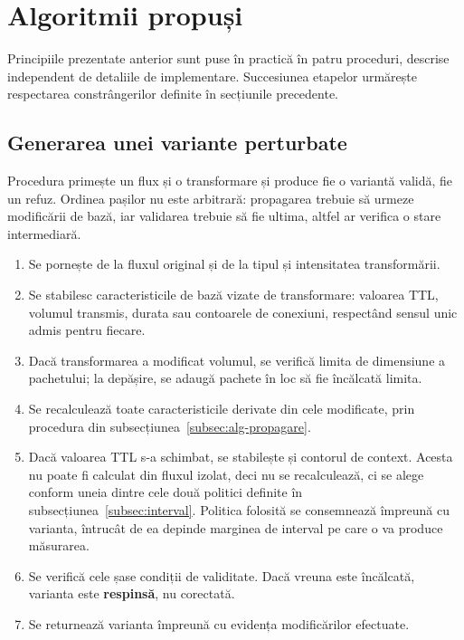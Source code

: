 \section{Algoritmii propuși}\label{sec:algoritmi}

Principiile prezentate anterior sunt puse în practică în patru proceduri, descrise independent de detaliile de implementare. Succesiunea etapelor urmărește respectarea constrângerilor definite în secțiunile precedente.

\subsection{Generarea unei variante perturbate}\label{subsec:alg-generare}

Procedura primește un flux și o transformare și produce fie o variantă validă, fie un refuz. Ordinea pașilor nu este arbitrară: propagarea trebuie să urmeze modificării de bază, iar validarea trebuie să fie ultima, altfel ar verifica o stare intermediară.

\begin{algorithm}[!ht]
\caption{Generarea unei variante perturbate}\label{alg:generare}
\begin{enumerate}\itemsep2pt
    \item Se pornește de la fluxul original și de la tipul și intensitatea transformării.
    \item Se stabilesc caracteristicile de bază vizate de transformare: valoarea TTL, volumul transmis, durata sau contoarele de conexiuni, respectând sensul unic admis pentru fiecare.
    \item Dacă transformarea a modificat volumul, se verifică limita de dimensiune a pachetului; la depășire, se adaugă pachete în loc să fie încălcată limita.
    \item Se recalculează toate caracteristicile derivate din cele modificate, prin procedura din subsecțiunea~\ref{subsec:alg-propagare}.
    \item Dacă valoarea TTL s-a schimbat, se stabilește și contorul de context. Acesta nu poate fi calculat din fluxul izolat, deci nu se recalculează, ci se alege conform uneia dintre cele două politici definite în subsecțiunea~\ref{subsec:interval}. Politica folosită se consemnează împreună cu varianta, întrucât de ea depinde marginea de interval pe care o va produce măsurarea.
    \item Se verifică cele șase condiții de validitate. Dacă vreuna este încălcată, varianta este \textbf{respinsă}, nu corectată.
    \item Se returnează varianta împreună cu evidența modificărilor efectuate.
\end{enumerate}
\end{algorithm}


